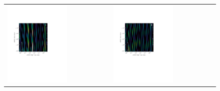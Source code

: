 \begin{figure}
\hspace{-2cm}\begin{tabular}{ll}
\includegraphics[clip, trim=0.5cm 9cm 5cm 5cm, width=0.6\textwidth]{chapters/psa128_pol/figures/pretty_I_0-022.pdf} &
\includegraphics[clip, trim=0.5cm 9cm 5cm 5cm, width=0.6\textwidth]{chapters/psa128_pol/figures/pretty_Q_0-011.pdf}\\

\end{tabular}
\end{figure}
